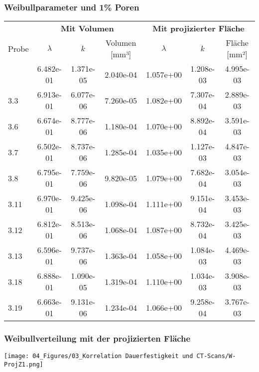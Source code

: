     \subsubsection{Weibullparameter und 1\% Poren}
    \label{Weibullparameter und 1Poren}
      \begingroup
      \renewcommand{\arraystretch}{1.5}
      \centering
      \begin{tabularx}{0.95\textwidth}{Xccc|ccc}
      \thickhline
            & \multicolumn{3}{c}{\textbf{Mit Volumen}}      & \multicolumn{3}{c}{\textbf{Mit projizierter Fläche}} \\ \thickhline
      Probe & $\lambda$     & \(k\)         & Volumen [mm³] & $\lambda$     & \(k\)         & Fläche [mm²] \\ \thickhline
      3.2   & 6.482e-01     & 1.371e-05     & 2.040e-04     & 1.057e+00     & 1.208e-03     & 4.995e-03 \\ \hline
      3.3   & 6.913e-01     & 6.077e-06     & 7.260e-05     & 1.082e+00     & 7.307e-04     & 2.889e-03 \\ \hline
      3.6   & 6.674e-01     & 8.777e-06     & 1.180e-04     & 1.070e+00     & 8.892e-04     & 3.591e-03 \\ \hline
      3.7   & 6.502e-01     & 8.737e-06     & 1.285e-04     & 1.035e+00     & 1.127e-03     & 4.847e-03 \\ \hline
      3.8   & 6.795e-01     & 7.759e-06     & 9.820e-05     & 1.079e+00     & 7.682e-04     & 3.054e-03 \\ \hline
      3.11  & 6.970e-01     & 9.425e-06     & 1.098e-04     & 1.111e+00     & 9.151e-04     & 3.453e-03 \\ \hline
      3.12  & 6.812e-01     & 8.513e-06     & 1.068e-04     & 1.087e+00     & 8.732e-04     & 3.425e-03 \\ \hline
      3.13  & 6.596e-01     & 9.737e-06     & 1.363e-04     & 1.058e+00     & 1.084e-03     & 4.469e-03 \\ \hline
      3.18  & 6.888e-01     & 1.090e-05     & 1.319e-04     & 1.110e+00     & 1.034e-03     & 3.908e-03 \\ \hline
      3.19  & 6.663e-01     & 9.131e-06     & 1.234e-04     & 1.066e+00     & 9.258e-04     & 3.767e-03 \\ \hline
      \end{tabularx}
      \endgroup

  \subsubsection{Weibullverteilung mit der projizierten Fläche}
    \label{Weibullverteilung mit der projizierten Fläche}
    \begin{center}
      \texttt{[image: 04\_Figures/03\_Korrelation Dauerfestigkeit und CT-Scans/W-ProjZ1.png]}
    \end{center}

